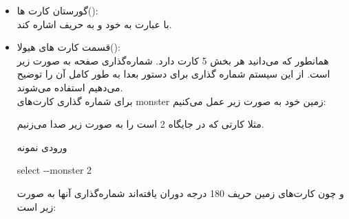 \documentclass[]{article}
\begin{document}
\begin{itemize}
	\item گورستان کارت ها():
	\\
	با عبارت  به  خود و  
	به  حریف اشاره کند.
	\item قسمت کارت های هیولا():
	\\
	همانطور که می‌دانید هر بخش 5 کارت دارد. شماره‌گذاری صفحه به صورت زیر است. 
	از این سیستم شماره گذاری برای دستور  بعدا به طور کامل آن را 
	توضیح 
	می‌دهیم استفاده می‌شوند.
	\\
	برای شماره گذاری کارت‌های monster زمین خود به صورت زیر عمل می‌کنیم:
	
	\begin{center}
	\begin{latin}
	\begin{table}[h]
		\centering
	\end{table}
\end{latin}
\end{center}

	
	مثلا کارتی که در جایگاه 2 است را به صورت زیر صدا می‌زنیم.
	\begin{mybox}[colback=yellow]{ورودی نمونه}
		\begin{latin}	
			select -{}-monster 2
		\end{latin}
	\end{mybox}
	و چون کارت‌های زمین حریف 180 درجه دوران یافته‌اند شماره‌گذاری آنها به صورت 
	زیر است:
	
		\begin{center}
		\begin{latin}
			\begin{table}[h]
				\centering
\end{table}
\end{latin}
\end{center}
\end{itemize}
\end{document}
